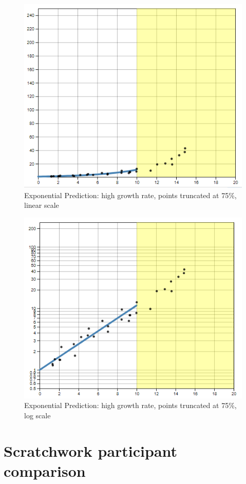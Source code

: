 \documentclass[print]{nuthesis}
\begin{document}
\begin{figure}[tbp]

{\centering \includegraphics[width=0.65\linewidth,]{images/02-you-draw-it/high-15-linear} 

}

\caption{Exponential Prediction: high growth rate, points truncated at 75\%, linear scale}\label{fig:high-15-linear}
\end{figure}

\begin{figure}[tbp]

{\centering \includegraphics[width=0.65\linewidth,]{images/02-you-draw-it/high-15-log} 

}

\caption{Exponential Prediction: high growth rate, points truncated at 75\%, log scale}\label{fig:high-15-log}
\end{figure}

\hypertarget{estimation-comparison}{%
\section{Scratchwork participant comparison}\label{estimation-comparison}}
\end{document}
